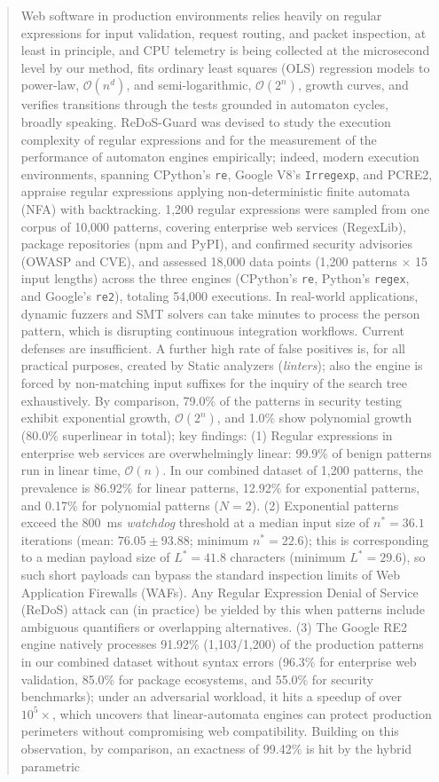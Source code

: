 \documentclass{ieeeaccess}
\begin{document}
\begin{abstract}
Web software in production environments relies heavily on regular expressions for input validation, request routing, and packet inspection, at least in principle, and CPU telemetry is being collected at the microsecond level by our method, fits ordinary least squares (OLS) regression models to power-law, $\mathcal{O}(n^d)$, and semi-logarithmic, $\mathcal{O}(2^n)$, growth curves, and verifies transitions through the tests grounded in automaton cycles, broadly speaking. ReDoS-Guard was devised to study the execution complexity of regular expressions and for the measurement of the performance of automaton engines empirically; indeed, modern execution environments, spanning CPython's \texttt{re}, Google V8's \texttt{Irregexp}, and PCRE2, appraise regular expressions applying non-deterministic finite automata (NFA) with backtracking. 1,200 regular expressions were sampled from one corpus of 10,000 patterns, covering enterprise web services (RegexLib), package repositories (npm and PyPI), and confirmed security advisories (OWASP and CVE), and assessed 18,000 data points (1,200 patterns $\times$ 15 input lengths) across the three engines (CPython's \texttt{re}, Python's \texttt{regex}, and Google's \texttt{re2}), totaling 54,000 executions. In real-world applications, dynamic fuzzers and SMT solvers can take minutes to process the person pattern, which is disrupting continuous integration workflows. Current defenses are insufficient. A further high rate of false positives is, for all practical purposes, created by Static analyzers (\emph{linters}); also the engine is forced by non-matching input suffixes for the inquiry of the search tree exhaustively. By comparison, 79.0\% of the patterns in security testing exhibit exponential growth, $\mathcal{O}(2^n)$, and 1.0\% show polynomial growth (80.0\% superlinear in total); key findings: (1) Regular expressions in enterprise web services are overwhelmingly linear: 99.9\% of benign patterns run in linear time, $\mathcal{O}(n)$. In our combined dataset of 1,200 patterns, the prevalence is 86.92\% for linear patterns, 12.92\% for exponential patterns, and 0.17\% for polynomial patterns ($N = 2$). (2) Exponential patterns exceed the 800~ms \emph{watchdog} threshold at a median input size of $n^* = 36.1$ iterations (mean: $76.05 \pm 93.88$; minimum $n^* = 22.6$); this is corresponding to a median payload size of $L^* = 41.8$ characters (minimum $L^* = 29.6$), so such short payloads can bypass the standard inspection limits of Web Application Firewalls (WAFs). Any Regular Expression Denial of Service (ReDoS) attack can (in practice) be yielded by this when patterns include ambiguous quantifiers or overlapping alternatives. (3) The Google RE2 engine natively processes 91.92\% (1{,}103/1{,}200) of the production patterns in our combined dataset without syntax errors (96.3\% for enterprise web validation, 85.0\% for package ecosystems, and 55.0\% for security benchmarks); under an adversarial workload, it hits a speedup of over $10^5\times$, which uncovers that linear-automata engines can protect production perimeters without compromising web compatibility. Building on this observation, by comparison, an exactness of 99.42\% is hit by the hybrid parametric 
\end{abstract}
\end{document}
